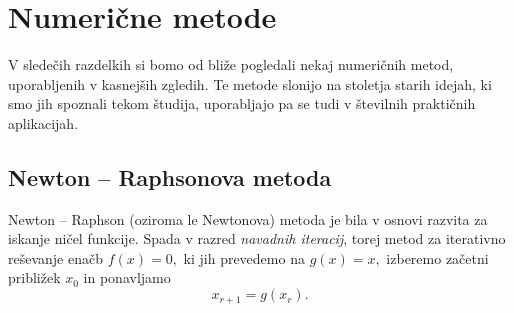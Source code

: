 \documentclass[12pt,a4paper]{amsart}
\theoremstyle{definition} %
\theoremstyle{plain} %
\begin{document}
\section{Numerične metode}
V sledečih razdelkih si bomo od bliže pogledali nekaj numeričnih metod, uporabljenih v kasnejših zgledih. Te metode slonijo na stoletja starih
idejah, ki smo jih spoznali tekom študija, uporabljajo pa se tudi v številnih praktičnih aplikacijah.
\subsection{Newton -- Raphsonova metoda} \label{nr}
Newton -- Raphson (oziroma le Newtonova) metoda je bila v osnovi razvita za iskanje ničel funkcije. Spada v razred \textit{navadnih iteracij}, torej metod za iterativno
reševanje enačb $f(x) = 0,$ ki jih prevedemo na $g(x) = x,$ izberemo začetni približek $x_{0}$ in ponavljamo 
\[
    x_{r+1} = g(x_{r}).
\]
\end{document}
